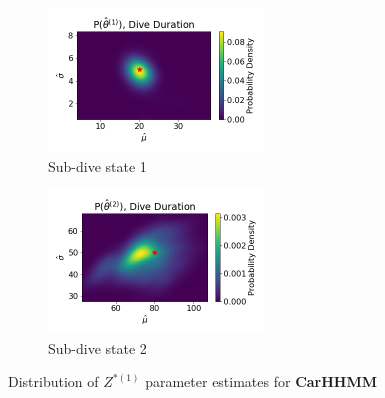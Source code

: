 \documentclass[12pt]{TD-CJS}
\begin{document}
\begin{figure}[ht]
	\centering
	\begin{subfigure}[t]{0.45\textwidth}
        \centering
        \includegraphics[width=2.25in]{../Plots/hhmm_V_MLE_density_dive_duration_-1_0.png}
        \caption{Sub-dive state 1}
    \end{subfigure}
    \begin{subfigure}[t]{0.45\textwidth}
        \centering
        \includegraphics[width=2.25in]{../Plots/hhmm_V_MLE_density_dive_duration_-1_1.png}
        \caption{Sub-dive state 2}
    \end{subfigure}
    \caption{Distribution of $Z^{*(1)}$ parameter estimates for \textbf{CarHHMM}}
\end{figure}
\end{document}
